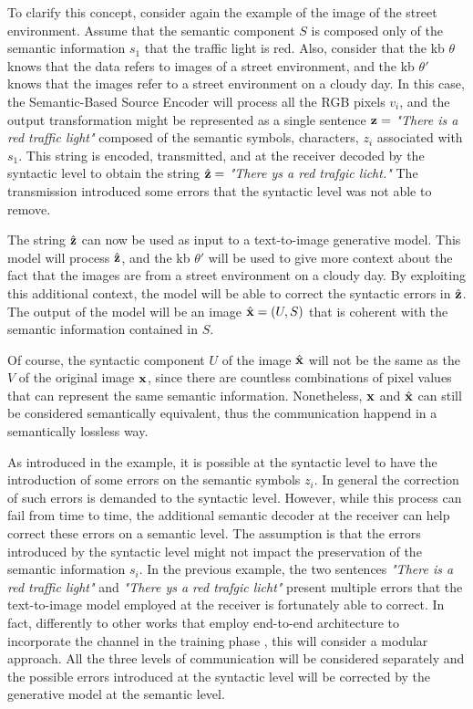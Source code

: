 To clarify this concept, consider again the example of the image of the street environment. Assume that the semantic component $S$ is composed only of the semantic information $s_1$ that the traffic light is red. Also, consider that the \gls{kb} $\theta$ knows that the data refers to images of a street environment, and the \gls{kb} $\theta'$ knows that the images refer to a street environment on a cloudy day. In this case, the Semantic-Based Source Encoder will process all the RGB pixels $v_i$, and the output transformation might be represented as a single sentence $\mathbf{z}=$ \textit{"There is a red traffic light"} composed of the semantic symbols, characters, $z_i$ associated with $s_1$. This string is encoded, transmitted, and at the receiver decoded by the syntactic level to obtain the string $\hat{\mathbf{z}}=$ \textit{"There ys a red trafgic licht."} The transmission introduced some errors that the syntactic level was not able to remove.

The string $\hat{\mathbf{z}}$ can now be used as input to a text-to-image generative model. This model will process $\hat{\mathbf{z}}$, and the \gls{kb} $\theta'$ will be used to give more context about the fact that the images are from a street environment on a cloudy day. By exploiting this additional context, the model will be able to correct the syntactic errors in $\hat{\mathbf{z}}$. The output of the model will be an image $\hat{\mathbf{x}}=(U,S)$ that is coherent with the semantic information contained in $S$.

Of course, the syntactic component $U$ of the image $\hat{\mathbf{x}}$ will not be the same as the $V$ of the original image $\mathbf{x}$, since there are countless combinations of pixel values that can represent the same semantic information. Nonetheless, $\mathbf{x}$ and $\hat{\mathbf{x}}$ can still be considered semantically equivalent, thus the communication happend in a semantically lossless way.

As introduced in the example, it is possible at the syntactic level to have the introduction of some errors on the semantic symbols $z_i$. In general the correction of such errors is demanded to the syntactic level. However, while this process can fail from time to time, the additional semantic decoder at the receiver can help correct these errors on a semantic level. The assumption is that the errors introduced by the syntactic level might not impact the preservation of the semantic information $s_i$. In the previous example, the two sentences \textit{"There is a red traffic light"} and \textit{"There ys a red trafgic licht"} present multiple errors that the text-to-image model employed at the receiver is fortunately able to correct. In fact, differently to other works that employ end-to-end architecture to incorporate the channel in the training phase \cite{Gunduz2019DeepJSCC, Felix2018OFDM}, this will consider a modular approach. All the three levels of communication will be considered separately and the possible errors introduced at the syntactic level will be corrected by the generative model at the semantic level. 

